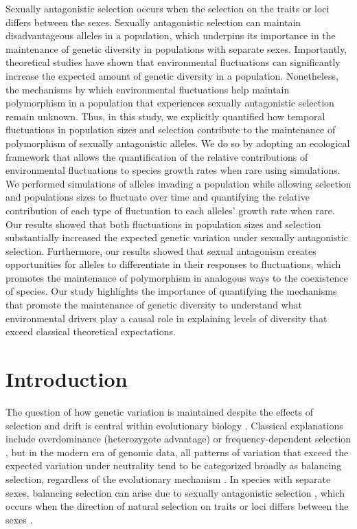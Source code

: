 \documentclass[12pt]{article}
\begin{document}
Sexually antagonistic selection occurs when the selection on the traits or loci differs between the sexes. Sexually antagonistic selection can maintain disadvantageous alleles in a population, which underpins its importance in the maintenance of genetic diversity in populations with separate sexes. Importantly, theoretical studies have shown that environmental fluctuations can significantly increase the expected amount of genetic diversity in a population. Nonetheless, the mechanisms by which environmental fluctuations help maintain polymorphism in a population that experiences sexually antagonistic selection remain unknown. Thus, in this study, we explicitly quantified how temporal fluctuations in population sizes and selection contribute to the maintenance of polymorphism of sexually antagonistic alleles. We do so by adopting an ecological framework that allows the quantification of the relative contributions of environmental fluctuations to species growth rates when rare using simulations.  We performed simulations of alleles invading a population while allowing selection and populations sizes to fluctuate over time and quantifying the relative contribution of each type of fluctuation to each alleles' growth rate when rare.  Our results showed that both fluctuations in population sizes and selection substantially increased the expected genetic variation under sexually antagonistic selection. Furthermore, our results showed that sexual antagonism creates opportunities for alleles to differentiate in their responses to fluctuations, which promotes the maintenance of polymorphism in analogous ways to the coexistence of species.  Our study highlights the importance of quantifying the mechanisms that promote the maintenance of genetic diversity to understand what environmental drivers play a causal role in explaining levels of diversity that exceed classical theoretical expectations.

\clearpage
\section{Introduction}
The question of how genetic variation is maintained despite the effects of selection and drift is central within evolutionary biology \citep{walsh_evolution_2018}. Classical explanations include overdominance (heterozygote advantage) or frequency-dependent selection \citep{hedrick2007balancing}, but in the modern era of genomic data, all patterns of variation that exceed the expected variation under neutrality tend to be categorized broadly as balancing selection, regardless of the evolutionary mechanism \citep{mitchell-olds_which_2007}. In species with separate sexes, balancing selection can arise due to sexually antagonistic selection \citep{connallon2014balancing}, which occurs when the direction of natural selection on traits or loci differs between the sexes \citep{lande1980sexual,arnqvist2013sexual}.
\end{document}
